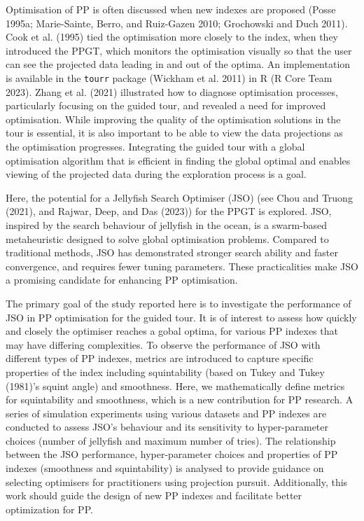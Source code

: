 \documentclass[
  12pt,
]{interact}
\theoremstyle{plain}
\begin{document}
Optimisation of PP is often discussed when new indexes are proposed
(Posse 1995a; Marie-Sainte, Berro, and Ruiz-Gazen 2010; Grochowski and
Duch 2011). Cook et al. (1995) tied the optimisation more closely to the
index, when they introduced the PPGT, which monitors the optimisation
visually so that the user can see the projected data leading in and out
of the optima. An implementation is available in the \texttt{tourr}
package (Wickham et al. 2011) in R (R Core Team 2023). Zhang et al.
(2021) illustrated how to diagnose optimisation processes, particularly
focusing on the guided tour, and revealed a need for improved
optimisation. While improving the quality of the optimisation solutions
in the tour is essential, it is also important to be able to view the
data projections as the optimisation progresses. Integrating the guided
tour with a global optimisation algorithm that is efficient in finding
the global optimal and enables viewing of the projected data during the
exploration process is a goal.

Here, the potential for a Jellyfish Search Optimiser (JSO) (see Chou and
Truong (2021), and Rajwar, Deep, and Das (2023)) for the PPGT is
explored. JSO, inspired by the search behaviour of jellyfish in the
ocean, is a swarm-based metaheuristic designed to solve global
optimisation problems. Compared to traditional methods, JSO has
demonstrated stronger search ability and faster convergence, and
requires fewer tuning parameters. These practicalities make JSO a
promising candidate for enhancing PP optimisation.

The primary goal of the study reported here is to investigate the
performance of JSO in PP optimisation for the guided tour. It is of
interest to assess how quickly and closely the optimiser reaches a gobal
optima, for various PP indexes that may have differing complexities. To
observe the performance of JSO with different types of PP indexes,
metrics are introduced to capture specific properties of the index
including squintability (based on Tukey and Tukey (1981)'s squint angle)
and smoothness. Here, we mathematically define metrics for squintability
and smoothness, which is a new contribution for PP research. A series of
simulation experiments using various datasets and PP indexes are
conducted to assess JSO's behaviour and its sensitivity to
hyper-parameter choices (number of jellyfish and maximum number of
tries). The relationship between the JSO performance, hyper-parameter
choices and properties of PP indexes (smoothness and squintability) is
analysed to provide guidance on selecting optimisers for practitioners
using projection pursuit. Additionally, this work should guide the
design of new PP indexes and facilitate better optimization for PP.
\end{document}
